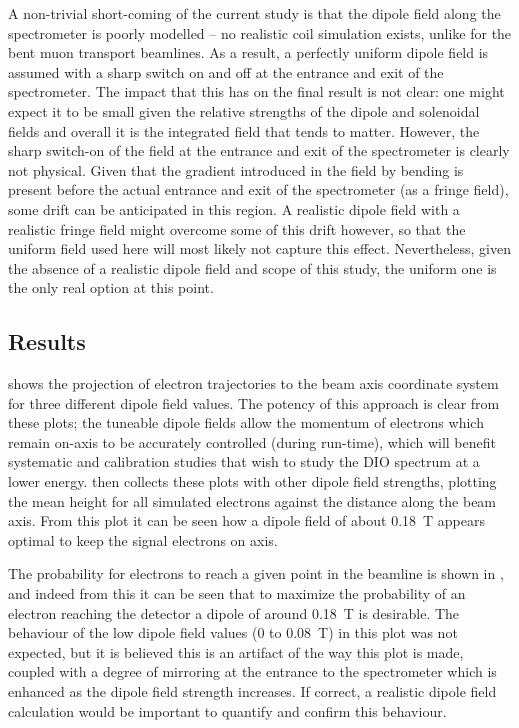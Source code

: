 A non-trivial short-coming of the current study is that the dipole field along the spectrometer is poorly modelled -- no realistic coil simulation exists, unlike for the bent muon transport beamlines.
As a result, a perfectly uniform dipole field is assumed with a sharp switch on and off at the entrance and exit of the spectrometer.
The impact that this has on the final result is not clear: one might expect it to be small given the relative strengths of the dipole and solenoidal fields and overall it is the integrated field that tends to matter.
However, the sharp switch-on of the field at the entrance and exit of the spectrometer is clearly not physical.
Given that the gradient introduced in the field by bending is present before the actual entrance and exit of the spectrometer (as a fringe field), some drift can be anticipated in this region.
A realistic dipole field with a realistic fringe field might overcome some of this drift however, so that the uniform field used here will most likely not capture this effect.
Nevertheless, given the absence of a realistic dipole field and scope of this study, the uniform one is the only real option at this point.

\subsection{Results}
\FigOptimESTDipoleBeamHeightTwoD
\FigOptimESTDipoleBeamHeightMean
{} shows the projection of electron trajectories to the beam axis coordinate system for three different dipole field values.
The potency of this approach is clear from these plots; the tuneable dipole fields allow the momentum of electrons which remain on-axis to be accurately controlled (during run-time), which will benefit systematic and calibration studies that wish to study the \ac{DIO} spectrum at a lower energy.
 then collects these plots with other dipole field strengths, plotting the mean height for all simulated electrons against the distance along the beam axis.
From this plot it can be seen how a dipole field of about 0.18~T appears optimal to keep the signal electrons on axis.

The probability for electrons to reach a given point in the beamline is shown in , and indeed from this it can be seen that to maximize the probability of an electron reaching the detector
a dipole of around 0.18~T is desirable.
The behaviour of the low dipole field values (0 to 0.08~T) in this plot was not expected, but it is believed this is an artifact of the way this plot is made, coupled with a degree of mirroring at the entrance to the spectrometer which is enhanced as the dipole field strength increases.
If correct, a realistic dipole field calculation would be important to quantify and confirm this behaviour.
\FigOptimESTDipoleBeamFluxMean

